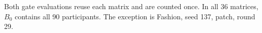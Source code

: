 \begin{table}[!t]
\centering\footnotesize
\setlength{\tabcolsep}{3.5pt}
\caption{Radial ratio of the initial acceptance pool on distinct attacked checkpoint matrices. The threshold is $\tau=2$.}\label{tab:gamma}

\vspace{2pt}\parbox{\linewidth}{\scriptsize Both gate evaluations reuse each matrix and are counted once. In all 36 matrices, $B_0$ contains all 90 participants. The exception is Fashion, seed 137, patch, round 29.}
\end{table}
